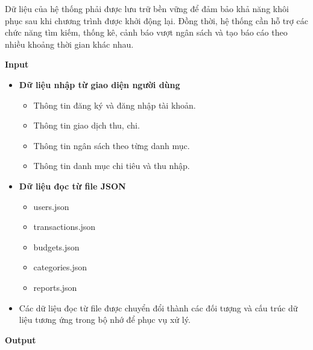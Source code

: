 \documentclass[12pt,letterpaper]{article}
\begin{document}
Dữ liệu của hệ thống phải được lưu trữ bền vững để đảm bảo khả năng khôi phục sau khi chương trình được khởi động lại. Đồng thời, hệ thống cần hỗ trợ các chức năng tìm kiếm, thống kê, cảnh báo vượt ngân sách và tạo báo cáo theo nhiều khoảng thời gian khác nhau.

\textbf{Input}

\begin{itemize}
\item \textbf{Dữ liệu nhập từ giao diện người dùng}
\begin{itemize}
\item Thông tin đăng ký và đăng nhập tài khoản.
\item Thông tin giao dịch thu, chi.
\item Thông tin ngân sách theo từng danh mục.
\item Thông tin danh mục chi tiêu và thu nhập.
\end{itemize}
\item \textbf{Dữ liệu đọc từ file JSON}
\begin{itemize}
    \item users.json
    \item transactions.json
    \item budgets.json
    \item categories.json
    \item reports.json
\end{itemize}

\item Các dữ liệu đọc từ file được chuyển đổi thành các đối tượng và cấu trúc dữ liệu tương ứng trong bộ nhớ để phục vụ xử lý.

\end{itemize}

\textbf{Output}
\end{document}
